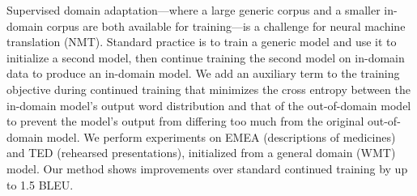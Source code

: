 Supervised domain adaptation---where a large generic corpus and a smaller in-domain corpus are both available for training---is a challenge for neural machine translation (NMT). Standard practice is to train a generic model and use it to initialize a second model, then continue training the second model on in-domain data to produce an in-domain model. We add an auxiliary term to the training objective during continued training that minimizes the cross entropy between the in-domain model's output word distribution and that of the out-of-domain model to prevent the model's output from differing too much from the original out-of-domain model. We perform experiments on EMEA (descriptions of medicines) and TED (rehearsed presentations), initialized from a general domain (WMT) model. Our method shows improvements over standard continued training by up to 1.5 BLEU.
